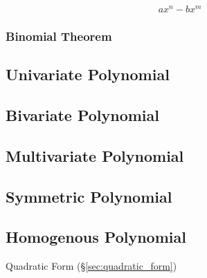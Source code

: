 \[
  a x^n - b x^m
\]


\subsubsection{Binomial Theorem}\label{sec:binomial_theorem}



\subsection{Univariate Polynomial}\label{sec:univariate_polynomial}

\subsection{Bivariate Polynomial}\label{sec:bivariate_polynomial}

\subsection{Multivariate Polynomial}\label{sec:multivariate_polynomial}

\subsection{Symmetric Polynomial}\label{sec:symmetric_polynomial}

\subsection{Homogenous Polynomial}\label{sec:homogenous_polynomial}

Quadratic Form (\S\ref{sec:quadratic_form})



